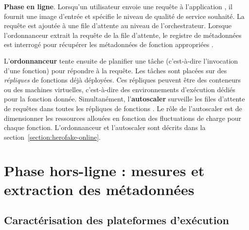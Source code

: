 \textbf{Phase en ligne}. Lorsqu'un utilisateur envoie une requête à l'application , il fournit une image d'entrée et spécifie le niveau de qualité de service souhaité. La requête est ajoutée à une file d'attente  au niveau de l'orchestrateur. Lorsque l'ordonnanceur extrait la requête de la file d'attente, le registre de métadonnées est interrogé pour récupérer les métadonnées de fonction appropriées .

L'\textbf{ordonnanceur} tente ensuite de planifier une tâche (c'est-à-dire l'invocation d'une fonction) pour répondre à la requête. Les tâches sont placées sur des \textit{répliques} de fonctions  déjà déployées. Ces répliques peuvent être des conteneurs ou des machines virtuelles, c'est-à-dire des environnements d'exécution dédiés pour la fonction donnée. Simultanément, l'\textbf{autoscaler} surveille les files d'attente de requêtes dans toutes les répliques de fonctions . Le rôle de l'autoscaler est de dimensionner les ressources allouées en fonction des fluctuations de charge pour chaque fonction. L'ordonnanceur et l'autoscaler sont décrits dans la section~\ref{section:herofake-online}.

\section{Phase hors-ligne : mesures et extraction des métadonnées}
\label{section:herofake-offline}

\subsection{Caractérisation des plateformes d'exécution}

\begin{table}[!ht]
    \caption{Execution platform characterization}
    \begin{center}
    \end{center}
    \label{table:herofake-platforms}
\end{table}

